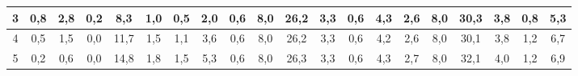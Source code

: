 \begin{sidewaystable}[]
\begin{tabular}{|c|c|c|c|c|c|c|c|c|c|c|c|c|c|c|c|c|c|c|c|}
    3  & 0,8                                             & 2,8                                             & 0,2                                             & 8,3                                              & 1,0                                              & 0,5                                              & 2,0                                              & 0,6                                              & 8,0                                              & 26,2                                             & 3,3                                              & 0,6                                              & 4,3                                              & 2,6                                              & 8,0                                              & 30,3                                             & 3,8                                              & 0,8                                              & 5,3                                              \\ \hline
    4  & 0,5                                             & 1,5                                             & 0,0                                             & 11,7                                             & 1,5                                              & 1,1                                              & 3,6                                              & 0,6                                              & 8,0                                              & 26,2                                             & 3,3                                              & 0,6                                              & 4,2                                              & 2,6                                              & 8,0                                              & 30,1                                             & 3,8                                              & 1,2                                              & 6,7                                              \\ \hline
    5  & 0,2                                             & 0,6                                             & 0,0                                             & 14,8                                             & 1,8                                              & 1,5                                              & 5,3                                              & 0,6                                              & 8,0                                              & 26,3                                             & 3,3                                              & 0,6                                              & 4,3                                              & 2,7                                              & 8,0                                              & 32,1                                             & 4,0                                              & 1,2                                              & 6,9                                              \\ \hline

\end{tabular}
\end{sidewaystable}
